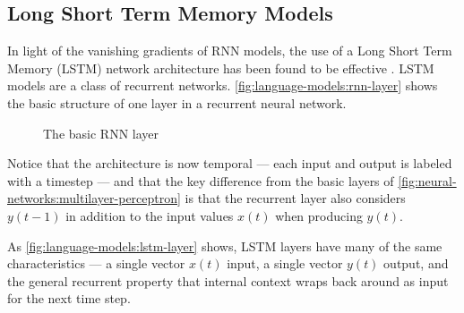 \subsection{Long Short Term Memory Models}\label{sec:language-models:lstms}

In light of the vanishing gradients of RNN models, the use of a Long Short Term Memory (LSTM) network architecture has been found to be effective \cite{lstm}.
LSTM models are a class of recurrent networks.
\autoref{fig:language-models:rnn-layer} shows the basic structure of one layer in a recurrent neural network.
\begin{figure}[h]
    \centering
    \caption{The basic RNN layer}\label{fig:language-models:rnn-layer}
\end{figure}
Notice that the architecture is now temporal --- each input and output is labeled with a timestep --- and that the key difference from the basic layers of \autoref{fig:neural-networks:multilayer-perceptron} is that the recurrent layer also considers $y(t-1)$ in addition to the input values $x(t)$ when producing $y(t)$.

As \autoref{fig:language-models:lstm-layer} shows, LSTM layers have many of the same characteristics --- a single vector $x(t)$ input, a single vector $y(t)$ output, and the general recurrent property that internal context wraps back around as input for the next time step.

